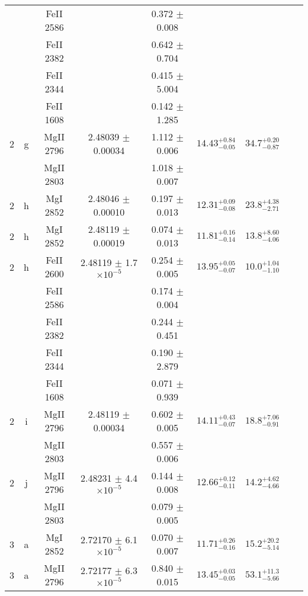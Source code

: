 \documentclass[12pt]{article}
\begin{document}
\begin{footnotesize}
\begin{longtable}{ c c c c c c c c c}
  &   & FeII     2586  &  &  0.372 $\pm$ 0.008   &   &     & 	 & \\ 
  &   & FeII     2382  &  &  0.642 $\pm$ 0.704   &   &     & 	 & \\ 
  &   & FeII     2344  &  &  0.415 $\pm$ 5.004   &   &     & 	 & \\ 
  &   & FeII     1608  &  &  0.142 $\pm$ 1.285   &   &     & 	 & \\ 
       2  & g  & MgII     2796  &  2.48039 $\pm$ 0.00034  &  1.112 $\pm$ 0.006   & $14.43_{ - 0.05}^{ + 0.84}$  & $34.7_{ - 0.87}^{ + 0.20}$    & 	 & \\ 
  &   & MgII     2803  &  &  1.018 $\pm$ 0.007   &   &     & 	 & \\ 
       2  & h  & MgI     2852  &  2.48046 $\pm$ 0.00010  &  0.197 $\pm$ 0.013   & $12.31_{ - 0.08}^{ + 0.09}$  & $23.8_{ - 2.71}^{ + 4.38}$    & 	 & \\ 
       2  & h  & MgI     2852  &  2.48119 $\pm$ 0.00019  &  0.074 $\pm$ 0.013   & $11.81_{ - 0.14}^{ + 0.16}$  & $13.8_{ - 4.06}^{ + 8.60}$    & 	 & \\ 
       2  & h  & FeII     2600  &  2.48119 $\pm$ 1.7 $\times 10^{-5}$   &  0.254 $\pm$ 0.005   & $13.95_{ - 0.07}^{ + 0.05}$  & $10.0_{ - 1.10}^{ + 1.04}$    & 	 & \\ 
  &   & FeII     2586  &  &  0.174 $\pm$ 0.004   &   &     & 	 & \\ 
  &   & FeII     2382  &  &  0.244 $\pm$ 0.451   &   &     & 	 & \\ 
  &   & FeII     2344  &  &  0.190 $\pm$ 2.879   &   &     & 	 & \\ 
  &   & FeII     1608  &  &  0.071 $\pm$ 0.939   &   &     & 	 & \\ 
       2  & i  & MgII     2796  &  2.48119 $\pm$ 0.00034  &  0.602 $\pm$ 0.005   & $14.11_{ - 0.07}^{ + 0.43}$  & $18.8_{ - 0.91}^{ + 7.06}$    & 	 & \\ 
  &   & MgII     2803  &  &  0.557 $\pm$ 0.006   &   &     & 	 & \\ 
       2  & j  & MgII     2796  &  2.48231 $\pm$ 4.4 $\times 10^{-5}$   &  0.144 $\pm$ 0.008   & $12.66_{ - 0.11}^{ + 0.12}$  & $14.2_{ - 4.66}^{ + 4.62}$    & 	 & \\ 
  &   & MgII     2803  &  &  0.079 $\pm$ 0.005   &   &     & 	 & \\ 
       3  & a  & MgI     2852  &  2.72170 $\pm$ 6.1 $\times 10^{-5}$   &  0.070 $\pm$ 0.007   & $11.71_{ - 0.16}^{ + 0.26}$  & $15.2_{ - 5.14}^{ + 20.2}$    & 	 & \\ 
       3  & a  & MgII     2796  &  2.72177 $\pm$ 6.3 $\times 10^{-5}$   &  0.840 $\pm$ 0.015   & $13.45_{ - 0.05}^{ + 0.03}$  & $53.1_{ - 5.66}^{ + 11.3}$    & 	 & \\ 

\end{longtable}
\end{footnotesize}
\end{document}
